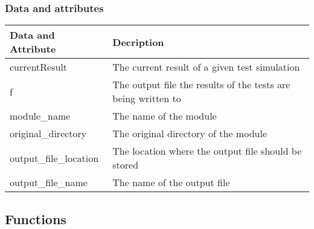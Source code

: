 \documentclass{asme2ej}
\begin{document}
\subsubsection{Data and attributes}
\begin{longtable}{ p{}  p{} }
\hline
Data and Attribute & Decription\\
\hline
\hline
currentResult & The current result of a given test simulation\\
f & The output file the results of the tests are being written to\\
module\_name & The name of the module\\
original\_directory & The original directory of the module\\
output\_file\_location & The location where the output file should be stored\\
output\_file\_name & The name of the output file\\
\hline
\end{longtable}

\subsection{Functions}
\end{document}
